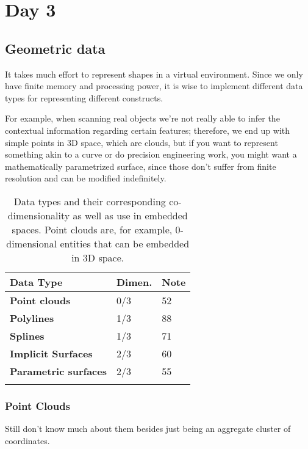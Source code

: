 \chapter{Day 3}

\section{Geometric data}

It takes much effort to represent shapes in a virtual environment. Since
we only have finite memory and processing power, it is wise to implement
different data types for representing different constructs.

\spa

For example, when scanning real objects we're not really able to infer the
contextual information regarding certain features; therefore, we end up with
simple points in 3D space, which are clouds, but if you want to represent something
akin to a curve or do precision engineering work, you might want a mathematically
parametrized surface, since those don't suffer from finite resolution and can
be modified indefinitely.

\begin{table*}[h] \centering
\begin{small}
\begin{tabular}{@{}lll@{}}\toprule
\textbf{Data Type} & \textbf{Dimen.} & \textbf{Note} \\ \midrule
\textbf{Point clouds} & 0/3 & 52  \\ \hdashline
\textbf{Polylines} & 1/3 & 88  \\ \hdashline
\textbf{Splines} & 1/3 & 71  \\ \hdashline
\textbf{Implicit Surfaces} & 2/3 & 60  \\ \hdashline
\textbf{Parametric surfaces} & 2/3 & 55\\ \hdashline
\bottomrule
\end{tabular}
\end{small}
\caption{Data types and their corresponding co-dimensionality as well
as use in embedded spaces. Point clouds are, for example, 0-dimensional
entities that can be embedded in 3D space.}
\end{table*}

\subsection{Point Clouds}

Still don't know much about them besides just being an aggregate cluster of
coordinates.


